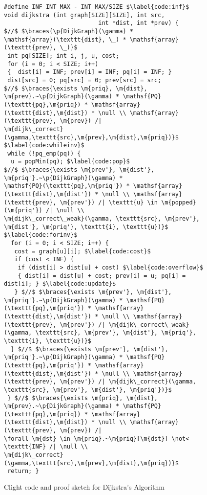 
\begin{figure}[htbp]

\begin{lstlisting}[mathescape=true,showlines=true]
#define INF INT_MAX - INT_MAX/SIZE $\label{code:inf}$
void dijkstra (int graph[SIZE][SIZE], int src, 
                           int *dist, int *prev) {
$//$ $\braces{\p{DijkGraph}(\gamma) * 
\mathsf{array}(\texttt{dist}, \_) * \mathsf{array}(\texttt{prev}, \_)}$
 int pq[SIZE]; int i, j, u, cost;
 for (i = 0; i < SIZE; i++) 
 {  dist[i] = INF; prev[i] = INF; pq[i] = INF; }
 dist[src] = 0; pq[src] = 0; prev[src] = src;
$//$ $\braces{\exists \m{priq}, \m{dist}, \m{prev}.~\p{DijkGraph}(\gamma) * \mathsf{PQ}(\texttt{pq},\m{priq}) * \mathsf{array}(\texttt{dist},\m{dist}) * \null \\ \mathsf{array}(\texttt{prev}, \m{prev}) /|
\m{dijk\_correct}(\gamma,\texttt{src},\m{prev},\m{dist},\m{priq})}$ $\label{code:whileinv}$
 while (!pq_emp(pq)) {
  u = popMin(pq); $\label{code:pop}$
$//$ $\braces{\exists \m{prev'}, \m{dist'}, \m{priq'}.~\p{DijkGraph}(\gamma) *
\mathsf{PQ}(\texttt{pq},\m{priq'}) * \mathsf{array}(\texttt{dist},\m{dist'}) * \null \\ \mathsf{array}(\texttt{prev}, \m{prev'}) /| \texttt{u} \in \m{popped}(\m{priq'}) /| \null \\
\m{dijk\_correct\_weak}(\gamma, \texttt{src}, \m{prev'}, \m{dist'}, \m{priq'}, \texttt{i}, \texttt{u})}$ $\label{code:forinv}$
  for (i = 0; i < SIZE; i++) {
   cost = graph[u][i]; $\label{code:cost}$
   if (cost < INF) {
    if (dist[i] > dist[u] + cost) $\label{code:overflow}$
    { dist[i] = dist[u] + cost; prev[i] = u; pq[i] = dist[i]; } $\label{code:update}$
   } $//$ $\braces{\exists \m{prev'}, \m{dist'}, \m{priq'}.~\p{DijkGraph}(\gamma) * \mathsf{PQ}(\texttt{pq},\m{priq'}) * \mathsf{array}(\texttt{dist},\m{dist'}) * \null \\ \mathsf{array}(\texttt{prev}, \m{prev'}) /| \m{dijk\_correct\_weak}(\gamma, \texttt{src}, \m{prev'}, \m{dist'}, \m{priq'}, \texttt{i}, \texttt{u})}$  
  } $//$ $\braces{\exists \m{prev'}, \m{dist'}, \m{priq'}.~\p{DijkGraph}(\gamma) * \mathsf{PQ}(\texttt{pq},\m{priq'}) * \mathsf{array}(\texttt{dist},\m{dist'}) * \null \\ \mathsf{array}(\texttt{prev}, \m{prev'}) /| \m{dijk\_correct}(\gamma, \texttt{src}, \m{prev'}, \m{dist'}, \m{priq'})}$
 } $//$ $\braces{\exists \m{priq}, \m{dist}, \m{prev}.~\p{DijkGraph}(\gamma) * \mathsf{PQ}(\texttt{pq},\m{priq}) * \mathsf{array}(\texttt{dist},\m{dist}) * \null \\ \mathsf{array}(\texttt{prev}, \m{prev}) /| 
\forall \m{dst} \in \m{priq}.~\m{priq}[\m{dst}] \not< \texttt{INF} /| \null \\
\m{dijk\_correct}(\gamma,\texttt{src},\m{prev},\m{dist},\m{priq})}$
 return; }
\end{lstlisting}
\caption{Clight code and proof sketch for Dijkstra's Algorithm}
\label{fig:decorated}
\end{figure}